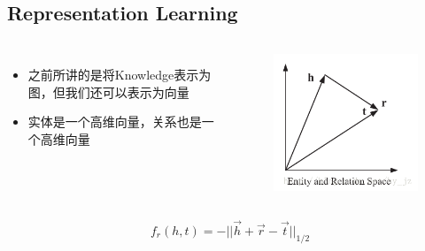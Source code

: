 \subsection*{Representation Learning}
\begin{frame}

	\begin{columns}
			\begin{itemize}
				\item 之前所讲的是将Knowledge表示为图，但我们还可以表示为向量
				\item 实体是一个高维向量，关系也是一个高维向量			
			\end{itemize}
			\begin{figure}[htbp]
				\centering
				\includegraphics[width=1\textwidth, bb= 0 0 400 400]{pic/kg/transE.png}
			\end{figure}
	\end{columns}
	
\end{frame}

\begin{frame}
\begin{equation}
f_r(h,t) = -||\vec{h} + \vec{r} - \vec{t}||_{1/2}
\end{equation}
\end{frame}
